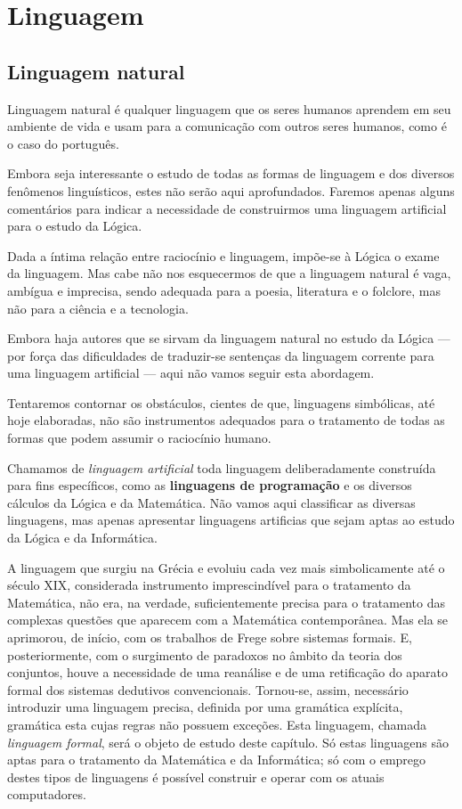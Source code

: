 
\chapter{Linguagem}
\section{Linguagem natural}

Linguagem natural é qualquer linguagem que os seres humanos aprendem em seu
ambiente de vida e usam para a comunicação com outros seres humanos, como é o
caso do português.

Embora seja interessante o estudo de todas as formas de linguagem e dos diversos
fenômenos linguísticos, estes não serão aqui aprofundados. Faremos apenas alguns
comentários para indicar a necessidade de construirmos uma linguagem artificial
para o estudo da Lógica.

Dada a íntima relação entre raciocínio e linguagem, impõe-se à Lógica o exame da linguagem.
Mas cabe não nos esquecermos de que a linguagem natural é vaga, ambígua e imprecisa, sendo adequada para a poesia, literatura e o folclore, mas não para a ciência e a tecnologia.

Embora haja autores que se sirvam da linguagem natural no estudo da Lógica --- por força das dificuldades de traduzir-se sentenças da linguagem corrente para uma linguagem artificial --- aqui não vamos seguir esta abordagem.

Tentaremos contornar os obstáculos, cientes de que, linguagens simbólicas, até hoje elaboradas, não são instrumentos adequados para o tratamento de todas as formas que podem assumir o raciocínio humano.

\newpage

Chamamos de \emph{linguagem artificial}
toda linguagem deliberadamente construída para fins específicos, como as \textbf{linguagens de programação} e os diversos cálculos da Lógica e da Matemática.
Não vamos aqui classificar as diversas linguagens, mas apenas apresentar linguagens artificias que sejam aptas ao estudo da Lógica e da Informática.

A linguagem que surgiu na Grécia e evoluiu cada vez mais simbolicamente até o século XIX, considerada instrumento imprescindível para o tratamento da Matemática, não era, na verdade, suficientemente precisa para o tratamento das complexas questões que aparecem com a Matemática contemporânea.
Mas ela se aprimorou, de início, com os trabalhos de Frege sobre sistemas formais.
E, posteriormente, com o surgimento de paradoxos no âmbito da teoria dos conjuntos, houve a necessidade de uma reanálise e de uma retificação do aparato formal dos sistemas dedutivos convencionais.
Tornou-se, assim, necessário introduzir uma linguagem precisa, definida por uma gramática explícita, gramática esta cujas regras não possuem exceções. Esta linguagem, chamada \emph{linguagem formal}, %
será o objeto de estudo deste capítulo.
Só estas linguagens são aptas para o tratamento da Matemática e da Informática;
só com o emprego destes tipos de linguagens é possível construir e operar com os atuais computadores.

